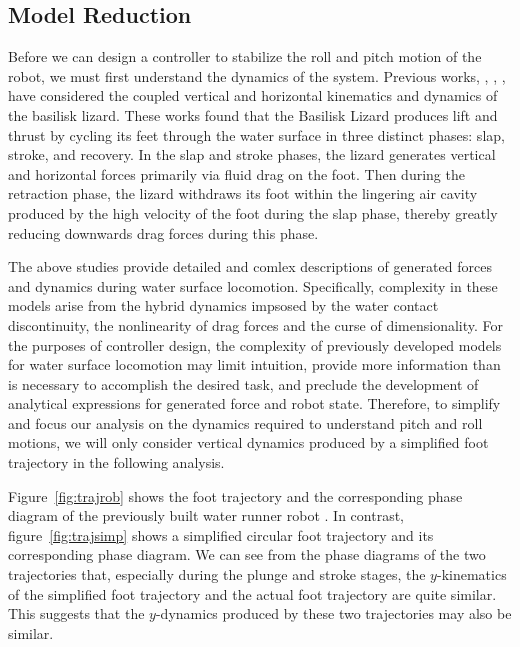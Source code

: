 \subsection{Model Reduction}

Before we can design a controller to stabilize the roll and pitch motion of the robot, we must first understand the dynamics of the system. Previous works, \cite{glasheen1996hydrodynamic}, \cite{floyd2008design}, \cite{hsieh2004running}, have considered the coupled vertical and horizontal kinematics and dynamics of the basilisk lizard. These works found that the Basilisk Lizard produces lift and thrust by cycling its feet through the water surface in three distinct phases: slap, stroke, and recovery. In the slap and stroke phases, the lizard generates vertical and horizontal forces primarily via fluid drag on the foot. Then during the retraction phase, the lizard withdraws its foot within the lingering air cavity produced by the high velocity of the foot during the slap phase, thereby greatly reducing downwards drag forces during this phase. 

The above studies provide detailed and comlex descriptions of generated forces and dynamics during water surface locomotion. Specifically, complexity in these models arise from the hybrid dynamics impsosed by the water contact discontinuity, the nonlinearity of drag forces and the curse of dimensionality. For the purposes of controller design, the complexity of previously developed models for water surface locomotion may limit intuition, provide more information than is necessary to accomplish the desired task, and preclude the development of analytical expressions for generated force and robot state. Therefore, to simplify and focus our analysis on the dynamics required to understand pitch and roll motions, we will only consider vertical dynamics produced by a simplified foot trajectory in the following analysis. 

Figure~\ref{fig:trajrob} shows the foot trajectory  and the corresponding phase diagram of the previously built water runner robot \cite{park2010roll}. In contrast, figure~\ref{fig:trajsimp} shows a simplified circular foot trajectory and its corresponding phase diagram. We can see from the phase diagrams of the two trajectories that, especially during the plunge and stroke stages, the $y$-kinematics of the simplified foot trajectory and the actual foot trajectory are quite similar. This suggests that the $y$-dynamics produced by these two trajectories may also be similar.

